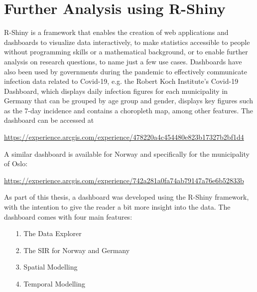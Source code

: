 %
\chapter{Further Analysis using R-Shiny}\label{ch:shiny}
R-Shiny is a framework that enables the creation of web applications and dashboards to visualize data interactively, to make statistics accessible to people without programming skills or a mathematical background, or to enable further analysis on research questions, to name just a few use cases. Dashboards have also been used by governments during the pandemic to effectively communicate infection data related to Covid-19, e.g. the Robert Koch Institute's Covid-19 Dashboard, which displays daily infection figures for each municipality in Germany that can be grouped by age group and gender, displays key figures such as the 7-day incidence and contains a choropleth map, among other features. The dashboard can be accessed at
\begin{center}
    \href{https://experience.arcgis.com/experience/478220a4c454480e823b17327b2bf1d4}{https://experience.arcgis.com/experience/478220a4c454480e823b17327b2bf1d4}
\end{center}
A similar dashboard is available for Norway and specifically for the municipality of Oslo:
\begin{center}
    \href{https://experience.arcgis.com/experience/742a281a0fa74ab79147a76e6b52833b}{https://experience.arcgis.com/experience/742a281a0fa74ab79147a76e6b52833b}
\end{center}
As part of this thesis, a dashboard was developed using the R-Shiny framework, with the intention to give the reader a bit more insight into the data. The dashboard comes with four main features:
\begin{itemize}
    \item[1.] The Data Explorer
    \item[2.] The SIR for Norway and Germany
    \item[3.] Spatial Modelling
    \item[4.] Temporal Modelling
\end{itemize}
